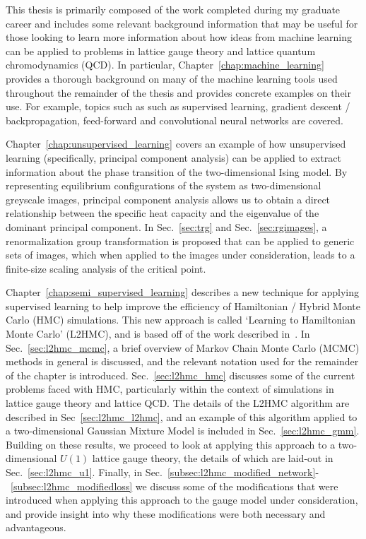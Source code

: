 \documentclass[../main.tex]{subfiles}
\begin{document}
This thesis is primarily composed of the work completed during my graduate career and includes some relevant background
information that may be useful for those looking to learn more information about how ideas from machine learning can be
applied to problems in lattice gauge theory and lattice quantum chromodynamics (QCD).
%
In particular, Chapter~\ref{chap:machine_learning} provides a thorough background on many of the machine learning tools
used throughout the remainder of the thesis and provides concrete examples on their use.
%
For example, topics such as such as supervised learning, gradient descent / backpropagation, feed-forward and
convolutional neural networks are covered.

Chapter~\ref{chap:unsupervised_learning} covers an example of how unsupervised learning (specifically, principal
component analysis) can be applied to extract information about the phase transition of the two-dimensional Ising
model.
%
By representing equilibrium configurations of the system as two-dimensional greyscale images, principal component
analysis allows us to obtain a direct relationship between the specific heat capacity and the eigenvalue of the
dominant principal component.
%
In Sec.~\ref{sec:trg} and Sec.~\ref{sec:rgimages}, a renormalization group transformation is proposed that can be
applied to generic sets of images, which when applied to the images under consideration, leads to a finite-size scaling
analysis of the critical point.

Chapter~\ref{chap:semi_supervised_learning} describes a new technique for applying supervised learning to help improve
the efficiency of Hamiltonian / Hybrid Monte Carlo (HMC) simulations.
%
This new approach is called `Learning to Hamiltonian Monte Carlo' (L2HMC), and is based off of the work described
in~\cite{2017arXiv171109268L}.
%
In Sec.~\ref{sec:l2hmc_mcmc}, a brief overview of Markov Chain Monte Carlo (MCMC) methods in general is discussed, and
the relevant notation used for the remainder of the chapter is introduced.
%
Sec.~\ref{sec:l2hmc_hmc} discusses some of the current problems faced with HMC, particularly within the context of
simulations in lattice gauge theory and lattice QCD.
%
The details of the L2HMC algorithm are described in Sec~\ref{sec:l2hmc_l2hmc}, and an example of this algorithm applied
to a two-dimensional Gaussian Mixture Model is included in Sec.~\ref{sec:l2hmc_gmm}.
%
Building on these results, we proceed to look at applying this approach to a two-dimensional $U(1)$ lattice gauge
theory, the details of which are laid-out in Sec.~\ref{sec:l2hmc_u1}.
%
Finally, in Sec.~\ref{subsec:l2hmc_modified_network}-~\ref{subsec:l2hmc_modifiedloss} we discuss some
of the modifications that were introduced when applying this approach to the gauge model under consideration, and
provide insight into why these modifications were both necessary and advantageous.
\end{document}
